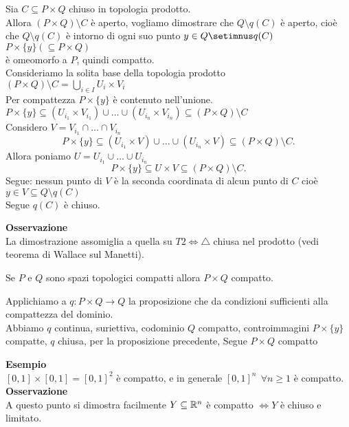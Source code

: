 \documentclass[12px]{article}
\begin{document}
\begin{dimo}
	Sia $C\subseteq P\times Q$ chiuso in topologia prodotto.\\
	Allora $(P\times Q)\setminus C$ è aperto, vogliamo dimostrare che $Q\setminus q(C)$ è aperto, cioè che $Q \setminus q(C)$ è intorno di ogni suo punto $y\in Q\setimnus q(C)$ \\
	$P\times \{y\} (\subseteq P\times Q)$\\
	è omeomorfo a  $P$, quindi compatto.\\
	Consideriamo la solita base della topologia prodotto\\$(P\times Q)\setminus C = \bigcup^{}_{i\in I}U_i\times V_i$ \\
	Per compattezza $P\times\{y\}$ è contenuto nell'unione.\\
$P\times \{y\}\subseteq (U_{i_1}\times V_{i_1})\cup\ldots\cup(U_{i_n}\times V_{i_n})\subseteq (P\times Q)\setminus C$\\
Considero $V = V_{i_1}\cap\ldots\cap V_{i_n}$\\
 \[
	 P\times \{y\}\subseteq (U_{i_1}\times V)\cup\ldots\cup ( U_{i_n}\times V)\subseteq (P\times Q)\setminus C
.\] 
Allora poniamo $U = U_{i_1}\cup\ldots\cup U_{i_n}$\\
\[
	P\times\{y\}\subseteq U\times V \subseteq (P\times Q)\setminus C
.\] 
Segue: nessun punto di $V$ è la seconda coordinata di alcun punto di $C$ cioè  $y\in V\subseteq Q\setminus q(C)$\\
Segue  $q(C)$ è chiuso.
\end{dimo}
\textbf{Osservazione}\\
La dimostrazione assomiglia a quella su $T2 \Leftrightarrow \triangle$ chiusa nel prodotto (vedi teorema di Wallace sul Manetti).\\
\begin{coro}
	Se $P$ e $Q$ sono spazi topologici compatti allora $P\times Q$ compatto.
\end{coro}
\begin{dimo}
	Applichiamo a $q: P\times Q \rightarrow Q$ la proposizione che da condizioni sufficienti alla compattezza del dominio.\\
	Abbiamo $q$ continua, suriettiva, codominio $Q$ compatto, controimmagini $P\times \{y\}$ compatte, $q$ chiusa, per la proposizione precedente, Segue $P\times Q$ compatto
\end{dimo}
\textbf{Esempio}\\
$[0,1]\times[0,1] = [0,1]^2$ è compatto, e in generale $[0,1]^n\ \ \forall n\geq 1$  è compatto.\\
 \textbf{Osservazione}\\
 A questo  punto si dimostra facilmente $Y\subseteq \mathbb{R}^n$ è compatto $ \Leftrightarrow Y$ è chiuso e limitato.
\end{document}
